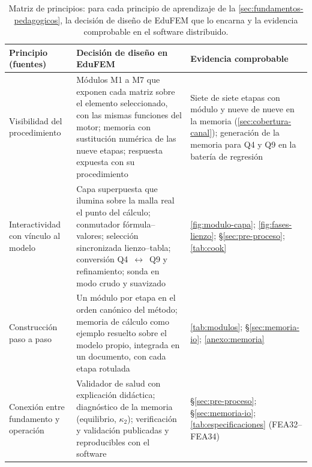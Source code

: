 \begin{table}[htbp]
\centering
\caption[Matriz de principios: principio de aprendizaje, decisión de diseño y evidencia.]{Matriz de principios: para cada principio de aprendizaje de la \autoref{sec:fundamentos-pedagogicos}, la decisión de diseño de EduFEM que lo encarna y la evidencia comprobable en el software distribuido.}
\label{tab:principios}
{\footnotesize
\setlength{\tabcolsep}{3pt}
\renewcommand{\arraystretch}{1.12}
\begin{tabular}{@{}>{\raggedright\arraybackslash}p{3.4cm}>{\raggedright\arraybackslash}p{5.6cm}>{\raggedright\arraybackslash}p{5.4cm}@{}}
\toprule
\textbf{Principio (fuentes)} & \textbf{Decisión de diseño en EduFEM} & \textbf{Evidencia comprobable} \\
\midrule
Visibilidad del procedimiento \autocites[p.~157]{lee2015interactive}[p.~136]{rutten2012learning} & Módulos M1 a M7 que exponen cada matriz sobre el elemento seleccionado, con las mismas funciones del motor; memoria con sustitución numérica de las nueve etapas; respuesta expuesta con su procedimiento & Siete de siete etapas con módulo y nueve de nueve en la memoria (\autoref{sec:cobertura-canal}); generación de la memoria para Q4 y Q9 en la batería de regresión \\
Interactividad con vínculo al modelo \autocites[pp.~163, 166]{lee2015interactive}[p.~220]{chi2014icap} & Capa superpuesta que ilumina sobre la malla real el punto del cálculo; conmutador fórmula--valores; selección sincronizada lienzo--tabla; conversión Q4~$\leftrightarrow$~Q9 y refinamiento; sonda en modo crudo y suavizado & \autoref{fig:modulo-capa}; \autoref{fig:fases-lienzo}; \S\ref{sec:pre-proceso}; \autoref{tab:cook} \\
Construcción paso a paso \autocites[pp.~4-5, 17]{bishay2020teaching}[p.~181]{atkinson2000learning} & Un módulo por etapa en el orden canónico del método; memoria de cálculo como ejemplo resuelto sobre el modelo propio, integrada en un documento, con cada etapa rotulada & \autoref{tab:modulos}; \S\ref{sec:memoria-io}; \autoref{anexo:memoria} \\
Conexión entre fundamento y operación \autocites[pp.~1159, 1168]{perezsantiago2023fem} & Validador de salud con explicación didáctica; diagnóstico de la memoria (equilibrio, $\kappa_2$); verificación y validación publicadas y reproducibles con el software & \S\ref{sec:pre-proceso}; \S\ref{sec:memoria-io}; \autoref{tab:especificaciones} (FEA32--FEA34) \\
\bottomrule
\end{tabular}}
\end{table}


